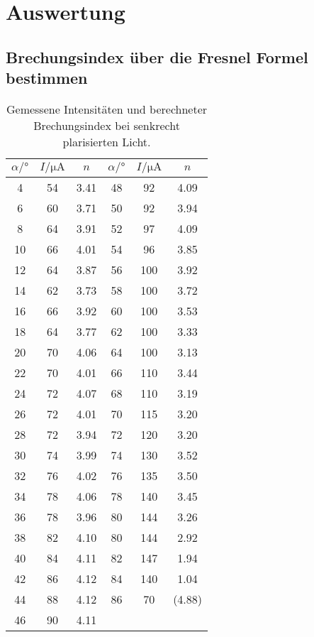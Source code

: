 \section{Auswertung}
\label{sec:Auswertung}

\subsection{Brechungsindex über die Fresnel Formel bestimmen}

\begin{table}[H]
  \centering
  \caption{Gemessene Intensitäten und berechneter Brechungsindex bei senkrecht plarisierten Licht.}
  \label{tab:senk}
  \begin{tabular}{c c c c c c}
    \toprule
    $\alpha /°$ & $I / \unit{\micro\ampere}$ & $n$ & $\alpha /°$ & $I / \unit{\micro\ampere}$ & $n$\\
    \midrule          
    4  &  54  & 3.41    & 48 &  92   & 4.09   \\
    6  &  60  & 3.71    & 50 &  92   & 3.94   \\ 
    8  &  64  & 3.91    & 52 &  97   & 4.09    \\
    10 &  66  & 4.01    & 54 &  96   & 3.85    \\
    12 &  64  & 3.87    & 56 &  100  & 3.92    \\
    14 &  62  & 3.73    & 58 &  100  & 3.72    \\
    16 &  66  & 3.92    & 60 &  100  & 3.53    \\
    18 &  64  & 3.77    & 62 &  100  & 3.33   \\ 
    20 &  70  & 4.06    & 64 &  100  & 3.13    \\
    22 &  70  & 4.01    & 66 &  110  & 3.44    \\
    24 &  72  & 4.07    & 68 &  110  & 3.19    \\
    26 &  72  & 4.01    & 70 &  115  & 3.20    \\
    28 &  72  & 3.94    & 72 &  120  & 3.20    \\
    30 &  74  & 3.99    & 74 &  130  & 3.52    \\
    32 &  76  & 4.02    & 76 &  135  & 3.50   \\ 
    34 &  78  & 4.06    & 78 &  140  & 3.45   \\
    36 &  78  & 3.96    & 80 &  144  & 3.26   \\
    38 &  82  & 4.10    & 80 &  144  & 2.92   \\
    40 &  84  & 4.11    & 82 &  147  & 1.94   \\
    42 &  86  & 4.12    & 84 &  140  & 1.04   \\
    44 &  88  & 4.12    & 86 &  70   & (4.88) \\ 
    46 &  90  & 4.11    &    &       &        \\                 
    \bottomrule
  \end{tabular}
\end{table}
      
